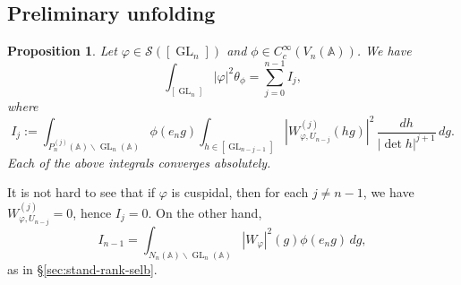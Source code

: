 \documentclass[reqno]{amsart}
\DeclareMathOperator{\GL}{GL}
\theoremstyle{plain} \newtheorem{theorem} {Theorem}
\newtheorem{proposition} [theorem] {Proposition}
\theoremstyle{definition} \newtheorem{definition} [theorem] {Definition}
\theoremstyle{itplain} %
\numberwithin{equation}{section}
\numberwithin{theorem}{section}
\begin{document}
\subsection{Preliminary unfolding}


\begin{proposition}\label{prop:sub-gln:let-varphi-in-preilm-unfold}
  Let $\varphi \in \mathcal{S}([\GL_n])$ and $\phi \in C_c^\infty(V_n(\mathbb{A}))$.  We have
  \begin{equation}\label{eq:int-_gl_n-varphi2}
    \int _{[\GL_n]} |\varphi|^2 \theta_\phi  =
    \sum_{j=0}^{n-1} I_j,
  \end{equation}
  where
  \begin{equation*}
    I_j := \int _{P_n^{(j)}(\mathbb{A}) \backslash \GL_n(\mathbb{A})} \phi(e_n g)
      \int _{h \in [\GL_{n-j-1}]}
      \left\lvert
      W_{\varphi,U_{n-j}}^{(j)} (h g) 
    \right\rvert^2
    \, \frac{d h}{|\det h|^{j+1}}
    \, d g.
  \end{equation*}
  Each of the above integrals converges absolutely.
\end{proposition}
\begin{remark}
  It is not hard to see that if $\varphi$ is cuspidal, then for each $j \neq n-1$, we have $W_{\varphi,U_{n-j}}^{(j)} = 0$, hence $I_j = 0$.  On the other hand,
  \begin{equation*}
I_{n-1} = \int _{N_n(\mathbb{A}) \backslash \GL_n(\mathbb{A})} |W_{\varphi}|^2(g) \phi(e_n g) \, d g,
\end{equation*}
as in \S\ref{sec:stand-rank-selb}.
\end{remark}
\end{document}
